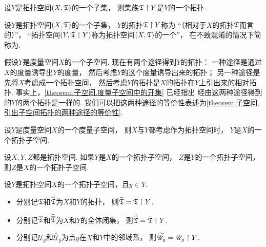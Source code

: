 \begin{lemma}
设\(Y\)是拓扑空间\((X,{\mathfrak T})\)的一个子集，
则集族\({\mathfrak T} \upharpoonright Y\)是\(Y\)的一个拓扑.
\end{lemma}

\begin{definition}
设\(Y\)是拓扑空间\((X,{\mathfrak T})\)的一个子集，
\(Y\)的拓扑\({\mathfrak T} \upharpoonright Y\)称为
“（相对于\(X\)的拓扑\({\mathfrak T}\)而言的）”，
“拓扑空间\((Y,{\mathfrak T} \upharpoonright Y)\)称为拓扑空间\((X,{\mathfrak T})\)的一个”，
在不致混淆的情况下简称为.
\end{definition}

假设\(Y\)是度量空间\(X\)的一个子空间.
现在有两个途径得到\(Y\)的拓扑：
一种途径是通过\(X\)的度量诱导出\(Y\)的度量，
然后考虑\(Y\)的这个度量诱导出来的拓扑；
另一种途径是先将\(X\)考虑成一个拓扑空间，
然后考虑\(Y\)的拓扑是\(X\)的拓扑在\(Y\)上引出来的相对拓扑.
事实上，\cref{theorem:子空间.度量子空间中的开集} 已经指出
经由这两种途径得到的\(Y\)的两个拓扑是一样的.
我们可以把这两种途径的等价性表述为\cref{theorem:子空间.引出子空间拓扑的两种途径的等价性}.
\begin{theorem}\label{theorem:子空间.引出子空间拓扑的两种途径的等价性}
设\(Y\)是度量空间\(X\)的一个度量子空间，
则\(X\)与\(Y\)都考虑作为拓扑空间时，
\(Y\)是\(X\)的一个拓扑子空间.
\end{theorem}

\begin{theorem}\label{theorem:子空间.亲子空间的传递性}
设\(X,Y,Z\)都是拓扑空间.
如果\(Y\)是\(X\)的一个拓扑子空间，
\(Z\)是\(Y\)的一个拓扑子空间，
则\(Z\)是\(X\)的一个拓扑子空间.
\end{theorem}

\begin{theorem}
设\(Y\)是拓扑空间\(X\)的一个拓扑子空间，且\(y \in Y\).
\def\Uy{\mathscr{U}_y}
\def\wUy{\widetilde{\Uy}}
\begin{itemize}
	\item 分别记\({\mathfrak T}\)和\(\widetilde{{\mathfrak T}}\)为\(X\)和\(Y\)的拓扑，
	则\(\widetilde{{\mathfrak T}} = {\mathfrak T} \upharpoonright Y\).
	\item 分别记\(\overline{{\mathfrak T}}\)和\(\widetilde{\overline{{\mathfrak T}}}\)为\(X\)和\(Y\)的全体闭集，
	则\(\widetilde{\overline{{\mathfrak T}}} = \overline{{\mathfrak T}} \upharpoonright Y\).
	\item 分别记\(\Uy\)和\(\wUy\)为点\(y\)在\(X\)和\(Y\)中的邻域系，
	则\(\wUy = \Uy \TopoRestrict Y\).
\end{itemize}
\end{theorem}

